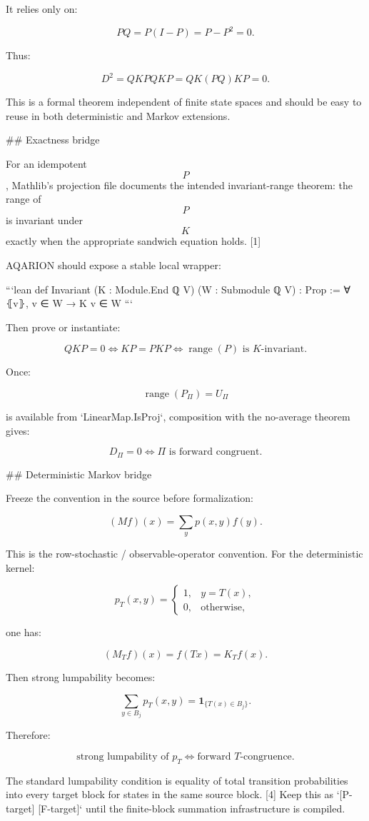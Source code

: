 It relies only on:

$$
PQ=P(I-P)=P-P^2=0.
$$

Thus:

$$
D^2=QKPQKP=QK(PQ)KP=0.
$$

This is a formal theorem independent of finite state spaces and should be easy to reuse in both deterministic and Markov extensions.

## Exactness bridge

For an idempotent $$P$$, Mathlib’s projection file documents the intended invariant-range theorem: the range of $$P$$ is invariant under $$K$$ exactly when the appropriate sandwich equation holds. [1]

AQARION should expose a stable local wrapper:

```lean
def Invariant
    (K : Module.End ℚ V) (W : Submodule ℚ V) : Prop :=
  ∀ ⦃v⦄, v ∈ W → K v ∈ W
```

Then prove or instantiate:

$$
QKP=0
\iff
KP=PKP
\iff
\operatorname{range}(P)\text{ is }K\text{-invariant}.
$$

Once:

$$
\operatorname{range}(P_\Pi)=U_\Pi
$$

is available from `LinearMap.IsProj`, composition with the no-average theorem gives:

$$
D_\Pi=0
\iff
\Pi\text{ is forward congruent}.
$$

## Deterministic Markov bridge

Freeze the convention in the source before formalization:

$$
(Mf)(x)=\sum_y p(x,y)f(y).
$$

This is the row-stochastic / observable-operator convention. For the deterministic kernel:

$$
p_T(x,y)=
\begin{cases}
1,&y=T(x),\\
0,&\text{otherwise},
\end{cases}
$$

one has:

$$
(M_Tf)(x)=f(Tx)=K_Tf(x).
$$

Then strong lumpability becomes:

$$
\sum_{y\in B_j}p_T(x,y)
=
\mathbf 1_{\{T(x)\in B_j\}}.
$$

Therefore:

$$
\boxed{
\text{strong lumpability of }p_T
\iff
\text{forward }T\text{-congruence}.
}
$$

The standard lumpability condition is equality of total transition probabilities into every target block for states in the same source block. [4] Keep this as `[P-target] [F-target]` until the finite-block summation infrastructure is compiled.

